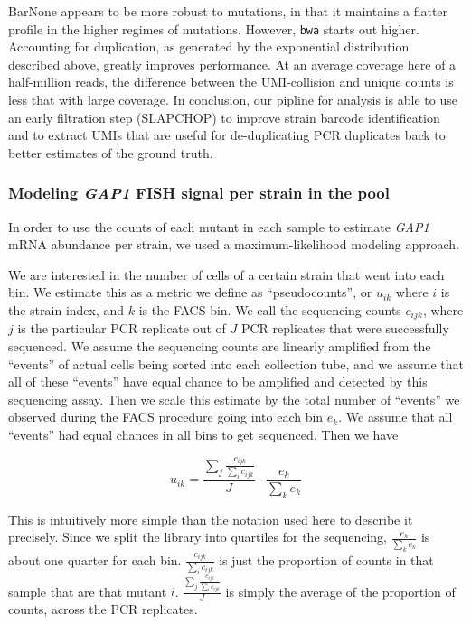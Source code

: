 BarNone appears to be more robust to mutations, in that it maintains a
flatter profile in the higher regimes of mutations. However,
\texttt{bwa} starts out higher. Accounting for duplication, as generated
by the exponential distribution described above, greatly improves
performance. At an average coverage here of a half-million reads, the
difference between the UMI-collision and unique counts is less that
with large coverage.  
In conclusion, our pipline for analysis is able to use an early
filtration step (SLAPCHOP) to improve strain barcode
identification and to extract UMIs that are useful for de-duplicating
PCR duplicates back to better estimates of the ground truth.

\subsubsection{Modeling \textit{GAP1} FISH signal per strain in the pool}

In order to use the counts of each mutant in each sample to estimate
\emph{GAP1} mRNA abundance per strain, we used a maximum-likelihood
modeling approach.

We are interested in the number of cells of a certain strain that went
into each bin. We estimate this as a metric we define as
``pseudocounts'', or \(u_{ik}\) where \(i\) is the strain index, and
\(k\) is the FACS bin. We call the sequencing counts \(c_{ijk}\), where
\(j\) is the particular PCR replicate out of \(J\) PCR replicates that
were successfully sequenced. We assume the sequencing counts are
linearly amplified from the ``events'' of actual cells being sorted into
each collection tube, and we assume that all of these ``events'' have
equal chance to be amplified and detected by this sequencing assay. Then
we scale this estimate by the total number of ``events'' we observed
during the FACS procedure going into each bin \(e_k\). We assume that
all ``events'' had equal chances in all bins to get sequenced. Then we
have

\[ u_{ik} = 
  \frac{ \sum_j \frac{c_{ijk}}{\sum_i c_{ijk}} }{J}
  \;\;\; \frac{ e_{k}}{\sum_{k} e_{k}} \]

This is intuitively more simple than the notation used here to describe
it precisely. Since we split the library into quartiles for the
sequencing, \(\frac{ e_{k}}{\sum_{k} e_{k}}\) is about one quarter for
each bin. \(\frac{ c_{ijk}}{\sum_{i} c_{ijk}}\) is just the proportion
of counts in that sample that are that mutant \(i\).
\(\frac{ \sum_j \frac{c_{ijk}}{\sum_i c_{ijk}} }{J}\) is simply the
average of the proportion of counts, across the PCR replicates.

